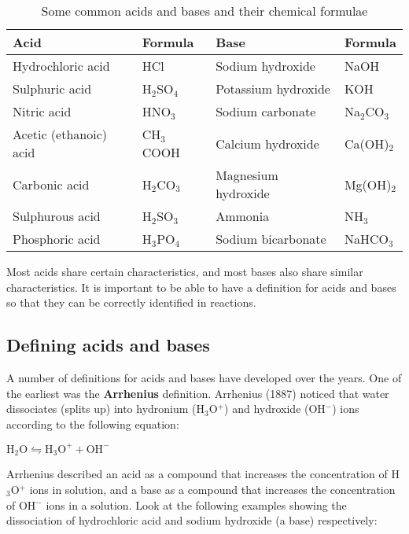\begin{table}[h]
\begin{center}
\caption{Some common acids and bases and their chemical formulae}
\label{tab:acids and bases}

\begin{tabular}{|l|l||l|l|}\hline
\textbf{Acid} & \textbf{Formula} & \textbf{Base} & \textbf{Formula}\\\hline
Hydrochloric acid & HCl & Sodium hydroxide & NaOH \\\hline
Sulphuric acid & H$_{2}$SO$_{4}$ & Potassium hydroxide & KOH \\\hline
Nitric acid & HNO$_{3}$ & Sodium carbonate & Na$_{2}$CO$_{3}$\\\hline
Acetic (ethanoic) acid & CH$_{3}$COOH & Calcium hydroxide & Ca(OH)$_{2}$ \\\hline
Carbonic acid & H$_{2}$CO$_{3}$ & Magnesium hydroxide & Mg(OH)$_{2}$ \\\hline
Sulphurous acid & H$_{2}$SO$_{3}$ & Ammonia & NH$_{3}$ \\\hline
Phosphoric acid & H$_{3}$PO$_{4}$ & Sodium bicarbonate & NaHCO$_{3}$ \\\hline
\end{tabular}
\end{center}
\end{table}

Most acids share certain characteristics, and most bases also share similar characteristics. It is important to be able to have a definition for acids and bases so that they can be correctly identified in reactions.

\subsection{Defining acids and bases}

A number of definitions for acids and bases have developed over the years. One of the earliest was the \textbf{Arrhenius} definition. Arrhenius (1887) noticed that water dissociates (splits up) into hydronium (H$_{3}$O$^{+}$) and hydroxide (OH$^{-}$) ions according to the following equation:

\begin{center}
$\text{H}_{2}\text{O} \leftrightharpoons \text{H}_{3}\text{O}^{+} + \text{OH}^{-}$
\end{center}


Arrhenius described an acid as a compound that increases the concentration of H$_{3}$O$^{+}$ ions in solution, and a base as a compound that increases the concentration of OH$^{-}$ ions in a solution. Look at the following examples showing the dissociation of hydrochloric acid and sodium hydroxide (a base) respectively:

